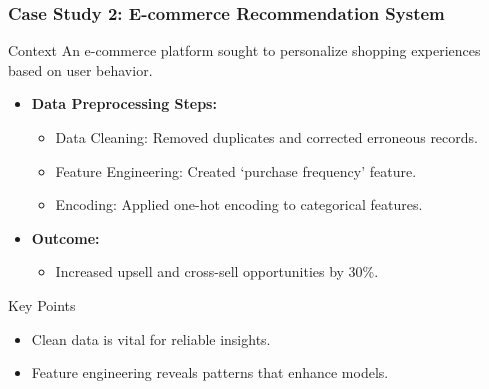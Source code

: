 \documentclass[aspectratio=169]{beamer}
\begin{document}
\begin{frame}[fragile]
    \frametitle{Case Study 2: E-commerce Recommendation System}
    \begin{block}{Context}
        An e-commerce platform sought to personalize shopping experiences based on user behavior.
    \end{block}
    
    \begin{itemize}
        \item \textbf{Data Preprocessing Steps:}
        \begin{itemize}
            \item Data Cleaning: Removed duplicates and corrected erroneous records.
            \item Feature Engineering: Created ‘purchase frequency’ feature.
            \item Encoding: Applied one-hot encoding to categorical features.
        \end{itemize}
        \item \textbf{Outcome:}
        \begin{itemize}
            \item Increased upsell and cross-sell opportunities by 30\%.
        \end{itemize}
    \end{itemize}
    
    \begin{block}{Key Points}
        \begin{itemize}
            \item Clean data is vital for reliable insights.
            \item Feature engineering reveals patterns that enhance models.
        \end{itemize}
    \end{block}
\end{frame}
\end{document}
